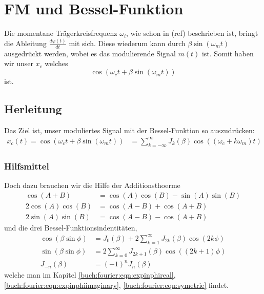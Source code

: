%
%
%
\section{FM und Bessel-Funktion 
\label{fm:section:proof}}
Die momentane Trägerkreisfrequenz \(\omega_i\), wie schon in (ref) beschrieben ist, bringt die Ableitung \(\frac{d \varphi(t)}{dt}\) mit sich.
Diese wiederum kann durch \(\beta\sin(\omega_mt)\) ausgedrückt werden, wobei es das modulierende Signal \(m(t)\) ist.
Somit haben wir unser \(x_c\) welches 
\[
\cos(\omega_c t+\beta\sin(\omega_mt))
\]
ist.

\subsection{Herleitung}
Das Ziel ist, unser moduliertes Signal mit der Bessel-Funktion so auszudrücken:
\begin{align}
    x_c(t)
    = 
    \cos(\omega_ct+\beta\sin(\omega_mt))
    &=
    \sum_{k= -\infty}^\infty J_{k}(\beta) \cos((\omega_c+k\omega_m)t)
    \label{fm:eq:proof}
\end{align}

\subsubsection{Hilfsmittel}
Doch dazu brauchen wir die Hilfe der Additionsthoerme 
\begin{align}
    \cos(A + B) 
    &= 
    \cos(A)\cos(B)-\sin(A)\sin(B)
    \label{fm:eq:addth1}
    \\
    2\cos (A)\cos (B)
    &=
    \cos(A-B)+\cos(A+B)
    \label{fm:eq:addth2}
    \\
    2\sin(A)\sin(B)
    &=
    \cos(A-B)-\cos(A+B)
    \label{fm:eq:addth3}
\end{align}
und die drei Bessel-Funktionsindentitäten,
\begin{align}
    \cos(\beta\sin\phi)
    &=
    J_0(\beta) + 2\sum_{k=1}^\infty J_{2k}(\beta) \cos(2k\phi)
    \label{fm:eq:besselid1}
    \\
    \sin(\beta\sin\phi)
    &=
    2\sum_{k=0}^\infty J_{2k+1}(\beta) \cos((2k+1)\phi)
    \label{fm:eq:besselid2}
    \\
    J_{-n}(\beta) &= (-1)^n J_n(\beta)
    \label{fm:eq:besselid3}
\end{align}
welche man im Kapitel \eqref{buch:fourier:eqn:expinphireal}, \eqref{buch:fourier:eqn:expinphiimaginary}, \eqref{buch:fourier:eqn:symetrie} findet.

